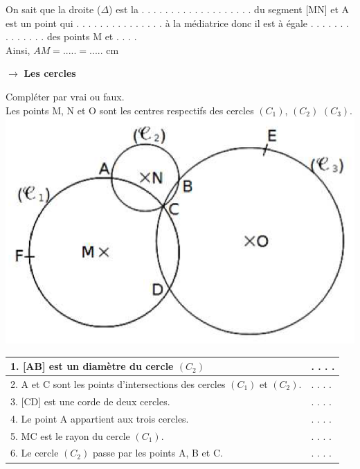 \documentclass[a4paper,11pt]{article}
\newcounter{numexo}
\newcommand{\exo}[1]{\stepcounter{numexo}\noindent{\bf \underline{Exercice~\thenumexo}}}
\begin{document}
On sait que la droite ($\Delta$) est la . . . . . . . . . . . . . . . . . . . du segment [MN] et A est un point qui . . . . . . . . . . . . . . . à la médiatrice donc il est à égale . . . . . . . . . . . . . .  des points M et . . . . \\
Ainsi, $AM = ..... = .....$ cm\\



\vspace*{1cm}

$\rightarrow$ \textbf{Les cercles}\\

\vspace*{0.5cm}


\exo \\ Compléter par vrai ou faux.\\

Les points M, N et O  sont les centres respectifs des cercles $(C_{1})$, $(C_{2})$ $(C_{3})$.\\

\includegraphics[scale=0.8]{cercle5.eps} \\

\begin{tabular}{|p{10cm}|p{3cm}|}
\hline 
1. [AB] est un diamètre du cercle $(C_{2})$ & . . . . \\ 
\hline 
2. A et C sont les points d'intersections des cercles $(C_{1})$ et $(C_{2})$. & . . . . \\ 
\hline 
3. [CD] est une corde de deux cercles. & . . . . \\ 
\hline 
4. Le point A appartient aux trois cercles. & . . . .\\ 
\hline 
5. MC est le rayon du cercle $(C_{1})$. &. . . . \\ 
\hline 
6. Le cercle $(C_{2})$ passe par les points A, B et C. & . . . . \\ 
\hline 
\end{tabular} 
\end{document}
